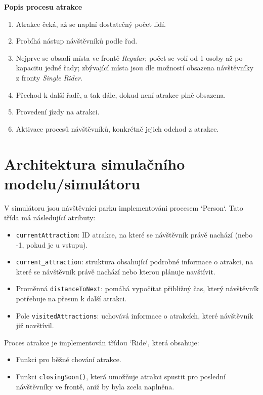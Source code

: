 \documentclass[a4paper,12pt]{article}
\begin{document}
\textbf{Popis procesu atrakce}
\begin{enumerate}[label=\textbf{\arabic*.}]
    \item Atrakce čeká, až se naplní dostatečný počet lidí.
    \item Probíhá nástup návštěvníků podle řad.
    \item Nejprve se obsadí místa ve frontě \textit{Regular}, počet se volí od 1 osoby až po kapacitu jedné řady; zbývající místa jsou dle možností obsazena návštěvníky z fronty \textit{Single Rider}.
    \item Přechod k další řadě, a tak dále, dokud není atrakce plně obsazena.
    \item Provedení jízdy na atrakci.
    \item Aktivace procesů návštěvníků, konkrétně jejich odchod z atrakce.
\end{enumerate}

\section{Architektura simulačního modelu/simulátoru}
V simulátoru jsou návštěvníci parku implementováni procesem `Person`. Tato třída má následující atributy:  

\begin{itemize}
    \item \texttt{currentAttraction}: ID atrakce, na které se návštěvník právě nachází (nebo -1, pokud je u vstupu).  
    \item \texttt{current\_attraction}: struktura obsahující podrobné informace o atrakci, na které se návštěvník právě nachází nebo kterou plánuje navštívit.  
    \item Proměnná \texttt{distanceToNext}: pomáhá vypočítat přibližný čas, který návštěvník potřebuje na přesun k další atrakci.  
    \item Pole \texttt{visitedAttractions}: uchovává informace o atrakcích, které návštěvník již navštívil.  
\end{itemize}

Proces atrakce je implementován třídou `Ride`, která obsahuje:  

\begin{itemize}
    \item Funkci pro běžné chování atrakce.  
    \item Funkci \texttt{closingSoon()}, která umožňuje atrakci spustit pro poslední návštěvníky ve frontě, aniž by byla zcela naplněna.  
\end{itemize} 
\end{document}
